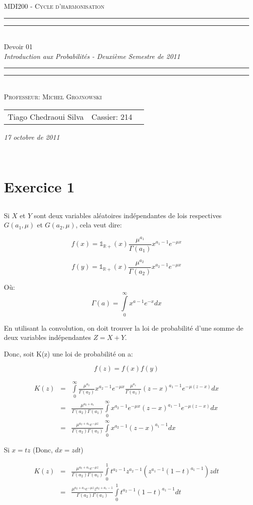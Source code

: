 \documentclass[a4paper]{article}
\date{Octobre 17, 2011}
\newcommand*{\titleTMB}{\begingroup \centering \settowidth{\unitlength}{\LARGE EE531} {\large\scshape MDI200 - Cycle d'harmonisation }\\[0.2\baselineskip] \rule{11.0cm}{1.6pt}\vspace*{-\baselineskip}\vspace*{2pt} \rule{11.0cm}{0.4pt}\\[\baselineskip] {\LARGE Devoir 01}\\\vspace*{\baselineskip}  {\itshape Introduction aux Probabilités - Deuxième Semestre de 2011}\\ \rule{11.0cm}{0.4pt}\vspace*{-\baselineskip}\vspace{3.2pt} \rule{11.0cm}{1.6pt}\\[\baselineskip] {\large\scshape Professeur: Michel Grojnowski}\par \vfill {\normalsize   \scshape 
    \begin{center} 
      \begin{tabular}{  l  l  p{5cm} } 
        Tiago Chedraoui Silva  & Cassier: 214\\
      \end{tabular} \end{center}
    \itshape 17 octobre de 2011    }\\[\baselineskip] \vspace{3.2pt} \endgroup}
\begin{document}
\titleTMB 
\newpage

\section{Exercice 1}

\subsection{}
Si $X$ et $Y$ sont deux variables aléatoires indépendantes de lois respectives $G(a_1,\mu)$ et $G(a_2,\mu)$, cela veut dire:

\begin{equation}
f(x)=\mathds{1}_{\mathbb{R}+}(x)\frac{\mu^{a_1}}{\Gamma (a_1)}x^{a_1-1}e^{-\mu x}
\end{equation}

\begin{equation}
f(y)=\mathds{1}_{\mathbb{R}+}(x)\frac{\mu^{a_2}}{\Gamma (a_2)}x^{a_2-1}e^{-\mu x}
\end{equation}

Où:
\begin{equation}
\Gamma \left( a \right) = \int\limits_0^\infty {x^{a - 1} } e^{ - x} dx  
\end{equation}

En utilisant la convolution, on doit trouver la loi de probabilité d'une somme de deux variables indépendantes $Z = X + Y$. 

Donc, soit K(z) une loi de probabilité on a:

\begin{equation}
f(z)=f(x)f(y)
\end{equation}

\begin{eqnarray*}
K(z) &=& \int\limits_0^\infty\frac{\mu^{a_2}}{\Gamma (a_2)}x^{a_2-1}e^{-\mu x} \frac{\mu^{a_1}}{\Gamma (a_1)}(z-x)^{a_1-1}e^{-\mu (z-x)}dx\\
&=&\frac{\mu^{a_2+a_1}}{\Gamma (a_2)\Gamma (a_1)}\int\limits_0^\infty{x^{a_2-1}e^{-\mu x} }(z-x)^{a_1-1}e^{-\mu (z-x)}dx\\
&=&\frac{\mu^{a_2+a_1}e^{-\mu z}}{\Gamma (a_2)\Gamma (a_1)}\int\limits_0^\infty{x^{a_2-1}}(z-x)^{a_1-1}dx
\end{eqnarray*}

Si $x = tz$ (Donc, $dx = zdt$)

\begin{eqnarray*}
K(z)&=&\frac{\mu^{a_2+a_1}e^{-\mu z}}{\Gamma (a_2)\Gamma (a_1)}\int\limits_0^1{t^{a_2-1}z^{a_2-1}}(z^{a_1-1}(1-t)^{a_1-1})zdt\\
&=&\frac{\mu^{a_2+a_1}e^{-\mu z}z^{a_2+a_1-1}}{\Gamma (a_2)\Gamma (a_1)}\int\limits_0^1{t^{a_2-1}}(1-t)^{a_1-1}dt
\end{eqnarray*}
\end{document}
